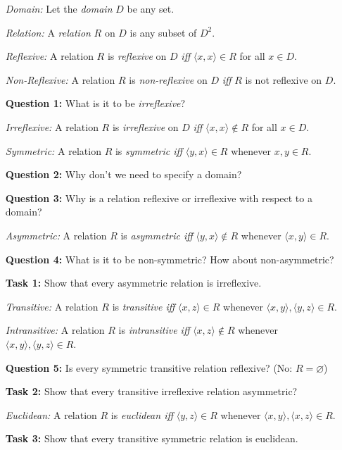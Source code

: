 \documentclass[a4paper, 11pt]{article} %
\newcommand{\tuple}[1]{\langle#1\rangle} %
\begin{document}
\begin{enumerate}
  \item[\it Domain:] Let the \textit{domain} $D$ be any set.
  \item[\it Relation:] A \textit{relation} $R$ on $D$ is any subset of $D^2$.
  \item[\it Reflexive:] A relation $R$ is \textit{reflexive} on $D$ \textit{iff} $\tuple{x,x}\in R$ for all $x\in D$.
  \item[\it Non-Reflexive:] A relation $R$ is \textit{non-reflexive} on $D$ \textit{iff} $R$ is not reflexive on $D$.
  \item[\bf Question 1:] What is it to be \textit{irreflexive}?
  \item[\it Irreflexive:] A relation $R$ is \textit{irreflexive} on $D$ \textit{iff} $\tuple{x,x}\notin R$ for all $x\in D$.
  \item[\it Symmetric:] A relation $R$ is \textit{symmetric iff} $\tuple{y,x}\in R$ whenever ${x,y}\in R$.
  \item[\bf Question 2:] Why don't we need to specify a domain?
  \item[\bf Question 3:] Why is a relation reflexive or irreflexive with respect to a domain?
  \item[\it Asymmetric:] A relation $R$ is \textit{asymmetric iff} $\tuple{y,x}\notin R$ whenever $\tuple{x,y}\in R$.
  \item[\bf Question 4:] What is it to be non-symmetric? How about non-asymmetric?
  \item[\bf Task 1:] Show that every asymmetric relation is irreflexive.
  \item[\it Transitive:] A relation $R$ is \textit{transitive iff} $\tuple{x,z}\in R$ whenever $\tuple{x,y},\tuple{y,z}\in R$.
  \item[\it Intransitive:] A relation $R$ is \textit{intransitive iff} $\tuple{x,z}\notin R$ whenever $\tuple{x,y},\tuple{y,z}\in R$.
  \item[\bf Question 5:] Is every symmetric transitive relation reflexive? (No: $R=\varnothing$)
  \item[\bf Task 2:] Show that every transitive irreflexive relation asymmetric?
  \item[\it Euclidean:] A relation $R$ is \textit{euclidean iff} $\tuple{y,z}\in R$ whenever $\tuple{x,y},\tuple{x,z}\in R$.
  \item[\bf Task 3:] Show that every transitive symmetric relation is euclidean.
\end{enumerate}


\end{document}
